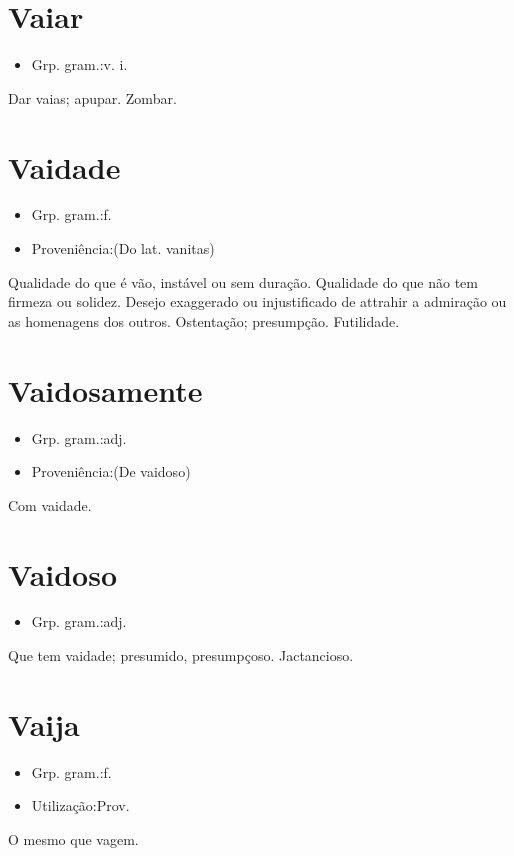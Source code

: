 \documentclass{article}
\begin{document}
\section{Vaiar}
\begin{itemize}
\item {Grp. gram.:v. i.}
\end{itemize}
Dar vaias; apupar.
Zombar.
\section{Vaidade}
\begin{itemize}
\item {Grp. gram.:f.}
\end{itemize}
\begin{itemize}
\item {Proveniência:(Do lat. \textunderscore vanitas\textunderscore )}
\end{itemize}
Qualidade do que é vão, instável ou sem duração.
Qualidade do que não tem firmeza ou solidez.
Desejo exaggerado ou injustificado de attrahir a admiração ou as homenagens dos outros.
Ostentação; presumpção.
Futilidade.
\section{Vaidosamente}
\begin{itemize}
\item {Grp. gram.:adj.}
\end{itemize}
\begin{itemize}
\item {Proveniência:(De \textunderscore vaidoso\textunderscore )}
\end{itemize}
Com vaidade.
\section{Vaidoso}
\begin{itemize}
\item {Grp. gram.:adj.}
\end{itemize}
Que tem vaidade; presumido, presumpçoso.
Jactancioso.
\section{Vaija}
\begin{itemize}
\item {Grp. gram.:f.}
\end{itemize}
\begin{itemize}
\item {Utilização:Prov.}
\end{itemize}
O mesmo que \textunderscore vagem\textunderscore .
\end{document}
